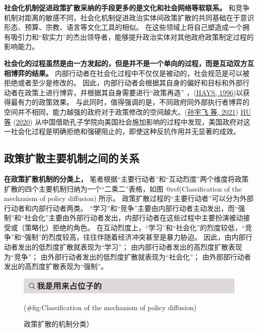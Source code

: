 \documentclass[
  12pt,
]{ctexart}
\begin{document}
\textbf{社会化机制促进政策扩散采纳的手段更多的是文化和社会网络等软联系。}
和竞争机制对距离的敏感不同，社会化机制促进政治实体间政策扩散的共同基础在于意识形态、预算、宗教、语言等文化工具的相似。
在这些领域上将自己塑造成一个拥有吸引力和``软实力''的杰出领导者，能够提升政治实体对其他政府政策制定过程的影响能力。

\textbf{社会化的过程虽然是由一方发起的，但是并不是一个单向的过程，而是互动双方互相博弈的结果。}
内部行动者在社会化过程中不仅仅是被动的，社会规范是可以被拒绝或者至少是修改的。
因此，内部行动者会根据其自身的偏好和目标和外部行动者在政策上进行博弈，并根据其自身需要进行``政策再造'' ，(\protect\hyperlink{ref-Hays1996}{HAYS, 1996})以获得最有力的政策效果。
与此同时，值得强调的是，不同政府同外部执行者博弈的空间并不相同，能力越强的政府对于政策修改的空间越大。(\protect\hyperlink{ref-SunYuFeiYangXueDong2021}{孙宇飞 等, 2021})
\protect\hyperlink{ref-HuEtAl2020a}{HU 等} (\protect\hyperlink{ref-HuEtAl2020a}{2020}) 从中国借助孔子学院向美国社会施加影响的过程中发现，美国政府对这一社会化过程是明确拒绝和强硬阻止的，即使这种反抗作用并无显著的成效。

\hypertarget{ux653fux7b56ux6269ux6563ux4e3bux8981ux673aux5236ux4e4bux95f4ux7684ux5173ux7cfb}{%
\subsection{政策扩散主要机制之间的关系}\label{ux653fux7b56ux6269ux6563ux4e3bux8981ux673aux5236ux4e4bux95f4ux7684ux5173ux7cfb}}

\textbf{在政策扩散机制的分类上，}
笔者根据``主要行动者''和``互动烈度''两个维度将政策扩散的四个主要机制归纳为一个``二乘二''表格，如图 @ref(Classification of the mechanism of policy diffusion) 所示。
政策扩散过程的``主要行动者''可以分为外部行动者和内部行动者两类。
``学习''和``竞争''主要由内部行动者主动发出，而``强制''和``社会化''主要由外部行动者发出，内部行动者在这些过程中主要扮演被动接受或（策略化）拒绝的角色。
在互动烈度上，``学习''和``社会化''的烈度较低，``竞争''和``强制''的烈度较高，往往伴随着经济冲突甚至是暴力胁迫。
因此，由内部行动者发出的低烈度扩散就表现为``学习''；
由内部行动者发出的高烈度扩散表现为``竞争''；
由外部行动者发出的低烈度扩散就表现为``社会化''；
由外部部行动者发出的高烈度扩散表现为``强制''。

\begin{figure}
\includegraphics[width=1\linewidth]{../figures/占位子的图} \caption{政策扩散的机制分类）}(\#fig:Classification of the mechanism of policy diffusion)
\end{figure}
\end{document}
